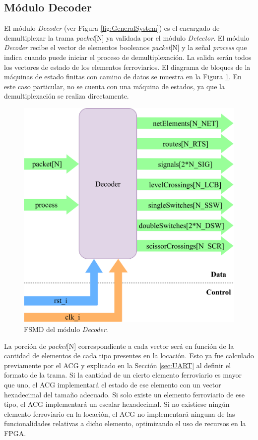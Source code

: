 \subsection{Módulo Decoder}
	\label{sec:decoder}
	
	El módulo \textit{Decoder} (ver Figura \ref{fig:GeneralSystem}) es el encargado de demultiplexar la trama \textit{packet}[N] ya validada por el módulo \textit{Detector}. El módulo \textit{Decoder} recibe el vector de elementos booleanos \textit{packet}[N] y la señal \textit{process} que indica cuando puede iniciar el proceso de demultiplexación. La salida serán todos los vectores de estado de los elementos ferroviarios. El diagrama de bloques de la máquinas de estado finitas con camino de datos se muestra en la Figura \ref{fig:Decoder_module}. En este caso particular, no se cuenta con una máquina de estados, ya que la demultiplexación se realiza directamente.
	
	\begin{figure}[H]
		\centering
		\includegraphics[width=1\textwidth]{Figuras/Decoder_module.png}
		\centering\caption{FSMD del módulo \textit{Decoder}.}
		\label{fig:Decoder_module}
	\end{figure}
	
	 La porción de \textit{packet}[N] correspondiente a cada vector será en función de la cantidad de elementos de cada tipo presentes en la locación. Esto ya fue calculado previamente por el ACG y explicado en la Sección \ref{sec:UART} al definir el formato de la trama. Si la cantidad de un cierto elemento ferroviario es mayor que uno, el ACG implementará el estado de ese elemento con un vector hexadecimal del tamaño adecuado. Si solo existe un elemento ferroviario de ese tipo, el ACG implementará un escalar hexadecimal. Si no existiese ningún elemento ferroviario en la locación, el ACG no implementará ninguna de las funcionalidades relativas a dicho elemento, optimizando el uso de recursos en la FPGA.
